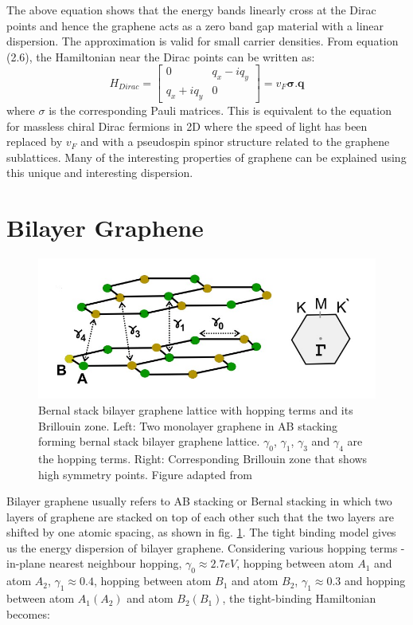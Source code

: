 The above equation shows that the energy bands linearly cross at the Dirac points and hence the graphene acts as a zero band gap material with a linear dispersion. The approximation is valid for small carrier densities. From equation (2.6), the Hamiltonian near the Dirac points can be written as:
\begin{equation}
    H_{Dirac} =\begin{bmatrix}
0 & q_x-i q_y \\
q_x+i q_y & 0 
\end{bmatrix} = v_F\boldsymbol{\sigma}.\boldsymbol{q}
\end{equation}
where $\sigma$ is the corresponding Pauli matrices. This is equivalent to the equation for massless chiral Dirac fermions in 2D where the speed of light has been replaced by $v_F$ and with a pseudospin spinor structure related to the graphene sublattices. Many of the interesting properties of graphene can be explained using this unique and interesting dispersion.

\section{Bilayer Graphene}
  \begin{figure}[H]
         \centering
         \includegraphics[width=\textwidth]{figures/bilayer_lattice.jpg}
         \caption{Bernal stack bilayer graphene lattice with hopping terms and its Brillouin zone. Left: Two monolayer graphene in AB stacking forming bernal stack bilayer graphene lattice. $\gamma_0$, $\gamma_1$, $\gamma_3$ and $\gamma_4$ are the hopping terms. Right: Corresponding Brillouin zone that shows high symmetry points. Figure adapted from \cite{Geim}}
         \label{fig:bilayer_lattice}
 \end{figure}
Bilayer graphene usually refers to AB stacking or Bernal stacking in which two layers of graphene are stacked on top of each other such that the two layers are shifted by one atomic spacing, as shown in fig. \ref{fig:bilayer_lattice}. The tight binding model gives us the energy dispersion of bilayer graphene. Considering various hopping terms - in-plane nearest neighbour hopping, $\gamma_0\approx2.7 eV$, hopping between atom $A_1$ and atom  $A_2$, $\gamma_1\approx0.4$, hopping between atom $B_1$ and atom $B_2$, $\gamma_1\approx0.3$ and hopping between atom $A_1(A_2)$ and atom $B_2(B_1)$, the tight-binding Hamiltonian becomes:

